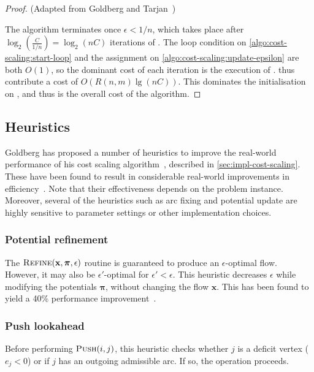 \costscalinggenericcomplexity*
\begin{proof} (Adapted from Goldberg and Tarjan~\cite[theorem~4.1]{Goldberg:1987})
    
    The algorithm terminates once $\epsilon < 1/n$, which takes place after $\log_2\left(\frac{C}{1/n}\right) = \log_2 (nC)$ iterations of . The loop condition on \cref{algo:cost-scaling:start-loop} and the assignment on \cref{algo:cost-scaling:update-epsilon} are both $O(1)$, so the dominant cost of each iteration is the execution of .  thus contribute a cost of $O\left(R(n,m)\lg(nC)\right)$. This dominates the initialisation on , and thus is the overall cost of the algorithm.
\end{proof}


\subsection{Heuristics} \label{appendix:impl-csheuristics}
Goldberg has proposed a number of heuristics to improve the real-world performance of his cost scaling algorithm~\cite{Goldberg:1997}, described in \cref{sec:impl-cost-scaling}. These have been found to result in considerable real-world improvements in efficiency~\cite{Bunnagel:1998,KiralyKovacs:2012}. Note that their effectiveness depends on the problem instance. Moreover, several of the heuristics such as arc fixing and potential update are highly sensitive to parameter settings or other implementation choices.

\subsubsection{Potential refinement} \label{appendix:impl-csheuristics-potential-refinement}
The $\textproc{Refine}(\mathbf{x},\boldsymbol{\pi},\epsilon)$ routine is guaranteed to produce an $\epsilon$-optimal flow. However, it may also be $\epsilon'$-optimal for $\epsilon' < \epsilon$. This heuristic decreases $\epsilon$ while modifying the potentials $\boldsymbol{\pi}$, without changing the flow $\mathbf{x}$. This has been found to yield a 40\% performance improvement~\cite{Bunnagel:1998}.

\subsubsection{Push lookahead}
Before performing $\textproc{Push}(i,j)$, this heuristic checks whether $j$ is a deficit vertex ($e_j < 0$) or if $j$ has an outgoing admissible arc. If so, the  operation proceeds.

